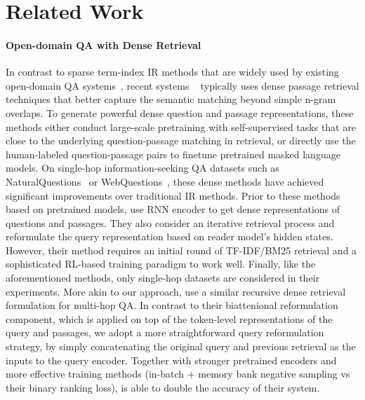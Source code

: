 \section{Related Work}
\label{sec:related_work}

\paragraph{Open-domain QA with Dense Retrieval}

In contrast to sparse term-index IR methods that are widely used by existing open-domain QA systems~\citep{drqa,wang2017r,yang2019end}, recent systems ~\citep{ORQA,REALM,DPR} typically uses dense passage retrieval techniques that better capture the semantic matching beyond simple n-gram overlaps. To generate powerful dense question and passage representations, these methods either conduct large-scale pretraining with self-supervised tasks that are close to the underlying question-passage matching in retrieval, or directly use the human-labeled question-passage pairs to finetune pretrained masked language models. On single-hop information-seeking QA datasets such as NaturalQuestions~\citep{NQ} or WebQuestions~\citep{WebQ}, these dense methods have achieved significant improvements over traditional IR methods. Prior to these methods based on pretrained models, \citet{das2019multi} use RNN encoder to get dense representations of questions and passages. They also consider an iterative retrieval process and reformulate the query representation based on reader model's hidden states. However, their method requires an initial round of TF-IDF/BM25 retrieval and a sophisticated RL-based training paradigm to work well. Finally, like the aforementioned methods, only single-hop datasets are considered in their experiments. More akin to our approach, \citet{feldman-el-yaniv-2019-multi} use a similar recursive dense retrieval formulation for multi-hop QA. In contrast to their biattenional reformulation component, which is applied on top of the token-level representations of the query and passages, we adopt a more straightforward query reformulation strategy, by simply concatenating the original query and previous retrieval as the inputs to the query encoder. Together with stronger pretrained encoders and more effective training methods (in-batch + memory bank negative sampling  vs their binary ranking loss), \method is able to double the accuracy of their system.  

